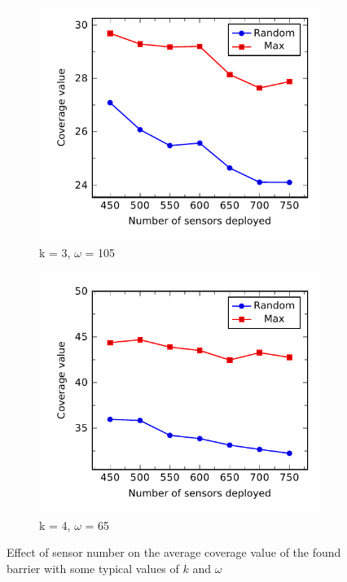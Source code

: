 \begin{figure}[h]
	\begin{subfigure}{.5\textwidth}
		\centering
		\includegraphics[scale=.8]{Hinhanh/SensorNumberEffect/coverage/k3omega105.pdf}
		\caption{k = 3, $\omega$ = 105}
	\end{subfigure}
	\begin{subfigure}{.5\textwidth}
		\centering
		\includegraphics[scale=.8]{Hinhanh/SensorNumberEffect/coverage/k4omega65.pdf}
		\caption{k = 4, $\omega$ = 65}
	\end{subfigure}
\caption{Effect of sensor number on the average coverage value of the found barrier with some typical values of $k$ and $\omega$}
\label{fig:}
\end{figure}
